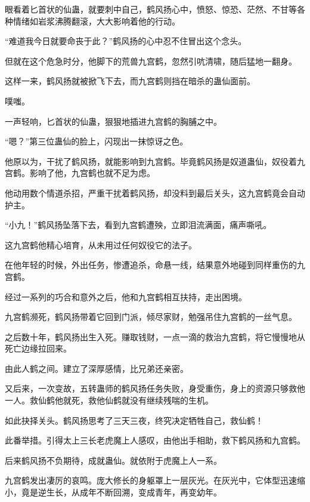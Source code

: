 
\begin{this_body}



眼看着匕首状的仙蛊，就要刺中自己，鹤风扬心中，愤怒、惊恐、茫然、不甘等各种情绪如岩浆沸腾翻滚，大大影响着他的行动。

“难道我今日就要命丧于此？”鹤风扬的心中忍不住冒出这个念头。

但就在这个危急时分，他脚下的荒兽九宫鹤，忽然引吭清啸，随后猛地一翻身。

这样一来，鹤风扬就被掀飞下去，而九宫鹤则挡在暗杀的蛊仙面前。

噗嗤。

一声轻响，匕首状的仙蛊，狠狠地插进九宫鹤的胸脯之中。

“嗯？”第三位蛊仙的脸上，闪现出一抹惊讶之色。

他原以为，干扰了鹤风扬，就能影响到九宫鹤。毕竟鹤风扬是奴道蛊仙，奴役着九宫鹤。影响了他，九宫鹤也就不足为虑。

他动用数个情道杀招，严重干扰着鹤风扬，却没料到最后关头，这九宫鹤竟会自动护主。

“小九！”鹤风扬坠落下去，看到九宫鹤遭殃，立即泪流满面，痛声嘶吼。

这九宫鹤他精心培育，从未用过任何奴役它的法子。

在他年轻的时候，外出任务，惨遭追杀，命悬一线，结果意外地碰到同样重伤的九宫鹤。

经过一系列的巧合和意外之后，他和九宫鹤相互扶持，走出困境。

九宫鹤濒死，鹤风扬带着它回到门派，倾尽家财，勉强吊住九宫鹤的一丝气息。

之后数十年，鹤风扬出生入死。赚取钱财，一点一滴的救治九宫鹤，将它慢慢地从死亡边缘拉回来。

由此人鹤之间。建立了深厚感情，比兄弟还亲密。

又后来，一次变故，五转蛊师的鹤风扬任务失败，身受重伤，身上的资源只够救他一人。救仙鹤他就死，救他仙鹤就没有继续残喘的生机。

如此抉择关头。鹤风扬思考了三天三夜，终究决定牺牲自己，救仙鹤！

此番举措。引得太上三长老虎魔上人感叹，由他出手相助，救下鹤风扬和九宫鹤。

后来鹤风扬不负期待，成就蛊仙。就依附于虎魔上人一系。

九宫鹤发出凄厉的哀鸣。庞大修长的身躯罩上一层灰光。在灰光中，它体型迅速缩小，竟是逆生长，从成年不断回溯，变成青年，再变幼年。


\end{this_body}

